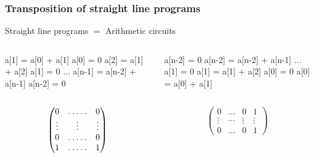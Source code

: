 \documentclass[10pt]{beamer}
\begin{document}
\begin{frame}[fragile]
  \frametitle{Transposition of straight line programs}

  \begin{center}
    \large
    Straight line programs $=$ Arithmetic circuits
  \end{center}

  \begin{columns}
    \begin{column}{0.5\textwidth}
      \begin{center}
        \begin{minipage}{0.7\textwidth}
\begin{semiverbatim}
  a[1] = a[0] + a[1]
  a[0] = 0
  a[2] = a[1] + a[2]
  a[1] = 0
  ...
  a[n-1] = a[n-2] + a[n-1]
  a[n-2] = 0
\end{semiverbatim}
        \end{minipage}
      \end{center}
    \end{column}

    \begin{column}{0.5\textwidth}
      \begin{center}
        \begin{minipage}{0.7\textwidth}
\begin{semiverbatim}
  a[n-2] = 0
  a[n-2] = a[n-2] + a[n-1]
  ...
  a[1] = 0
  a[1] = a[1] + a[2]
  a[0] = 0
  a[0] = a[0] + a[1]
\end{semiverbatim}
        \end{minipage}
      \end{center}
    \end{column}
    \end{columns}
  
  \vfill

  \begin{columns}
    \begin{column}{0.5\textwidth}
      \begin{equation*}
        \begin{pmatrix}
          0 & \hdotsfor{3} & 0\\
          \vdots  &  &\vdots&& \vdots \\
          0 & \hdotsfor{3} & 0\\
          1 & \hdotsfor{3} & 1
        \end{pmatrix}
      \end{equation*}
    \end{column}

    \begin{column}{0.5\textwidth}
      \begin{equation*}
        \begin{pmatrix}
          0 & \hdots & 0 & 1\\
          \vdots  &  \cdots & \vdots & \vdots \\
          0 & \hdots & 0 & 1
        \end{pmatrix}
      \end{equation*}
    \end{column}
  \end{columns}
\end{frame}
\end{document}
